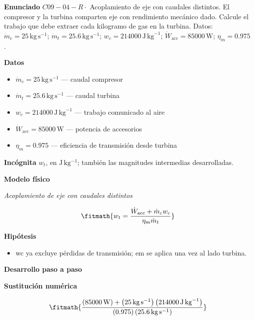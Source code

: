 \documentclass[10pt,openany]{book}
\begin{document}
\begin{tcolorbox}[title={Problema resuelto 4}, studiumworked, breakable]

\noindent\textbf{Enunciado}
\(C09-04-R \cdot\) Acoplamiento de eje con caudales distintos. El compresor y la turbina comparten eje con rendimiento mecánico dado. Calcule el trabajo que debe extraer cada kilogramo de gas en la turbina. Datos: \(\dot{m}_c=25\, \mathrm{kg}\,\mathrm{s}^{-1}\); \(\dot{m}_t=25.6\, \mathrm{kg}\,\mathrm{s}^{-1}\); \(w_c=214000\, \mathrm{J}\,\mathrm{kg}^{-1}\); \(\dot{W}_{\mathrm{acc}}=85000\, \mathrm{W}\); \(\eta_m=0.975\).

\noindent\textbf{Datos}
\begin{itemize}
\item $\dot{m}_c = 25\,\mathrm{kg}\,\mathrm{s}^{-1}$ — caudal compresor
\item $\dot{m}_t = 25.6\,\mathrm{kg}\,\mathrm{s}^{-1}$ — caudal turbina
\item $w_c = 214000\,\mathrm{J}\,\mathrm{kg}^{-1}$ — trabajo comunicado al aire
\item $\dot{W}_{\mathrm{acc}} = 85000\,\mathrm{W}$ — potencia de accesorios
\item $\eta_m = 0.975$ — eficiencia de transmisión desde turbina
\end{itemize}

\noindent\textbf{Incógnita}
$w_t$, en $\mathrm{J\,kg^{-1}}$; también las magnitudes intermedias desarrolladas.

\noindent\textbf{Modelo físico}

\noindent\textit{Acoplamiento de eje con caudales distintos}

\[
\fitmath{w_t=\frac{\dot{W}_{\mathrm{acc}} + \dot{m}_c w_c}{\eta_m \dot{m}_t}}
\]

\noindent\textbf{Hipótesis}
\begin{itemize}
\item wc ya excluye pérdidas de transmisión; em se aplica una vez al lado turbina.
\end{itemize}

\noindent\textbf{Desarrollo paso a paso}



\noindent\textbf{Sustitución numérica}

\[
\fitmath{\frac{\left(85000\,\mathrm{W}\right) + \left(25\,\mathrm{kg}\,\mathrm{s}^{-1}\right) \left(214000\,\mathrm{J}\,\mathrm{kg}^{-1}\right)}{\left(0.975\right) \left(25.6\,\mathrm{kg}\,\mathrm{s}^{-1}\right)}}
\]


\end{tcolorbox}
\end{document}
